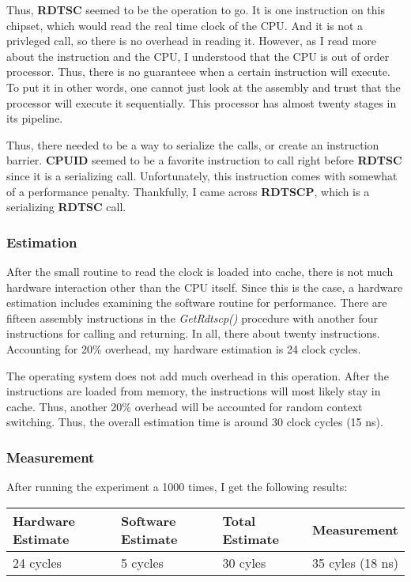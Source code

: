 \documentclass[paper=a4, fontsize=11pt]{scrartcl}
\numberwithin{equation}{section}		%
\numberwithin{figure}{section}			%
\numberwithin{table}{section}				%
\begin{document}
Thus, \textbf{RDTSC} seemed to be the operation to go.  It is one instruction on this chipset, which would read the real time clock of the CPU.  And it is not a privleged call, so there is no overhead in reading it.  However, as I read more about the instruction and the CPU, I understood that the CPU is out of order processor.  Thus, there is no guaranteee when a certain instruction will execute.  To put it in other words, one cannot just look at the assembly and trust that the processor will execute it sequentially.  This processor has almost twenty stages in its pipeline.

Thus, there needed to be a way to serialize the calls, or create an instruction barrier.  \textbf{CPUID} seemed to be a favorite instruction to call right before \textbf{RDTSC} since it is a serializing call.  Unfortunately, this instruction comes with somewhat of a performance penalty.  Thankfully, I came across \textbf{RDTSCP}, which is a serializing \textbf{RDTSC} call.

\subsubsection{Estimation}

After the small routine to read the clock is loaded into cache, there is not much hardware interaction other than the CPU itself.  Since this is the case, a hardware estimation includes examining the software routine for performance.  There are fifteen assembly instructions in the \textit{GetRdtscp()} procedure with another four instructions for calling and returning.  In all, there about twenty instructions.  Accounting for 20\% overhead, my hardware estimation is 24 clock cycles.

The operating system does not add much overhead in this operation.  After the instructions are loaded from memory, the instructions will most likely stay in cache.  Thus, another 20\% overhead will be accounted for random context switching.  Thus, the overall estimation time is around 30 clock cycles (15 ns).

\subsubsection{Measurement}

After running the experiment a 1000 times, I get the following results:

\begin{center}
    \begin{tabular}{ | l | l | l | p{5cm} |}
    \hline
    Hardware Estimate & Software Estimate & Total Estimate & Measurement \\ \hline
    24 cycles & 5 cycles & 30 cyles & 35 cyles (18 ns) \\ 
    \hline
    \end{tabular}
\end{center}
\end{document}
